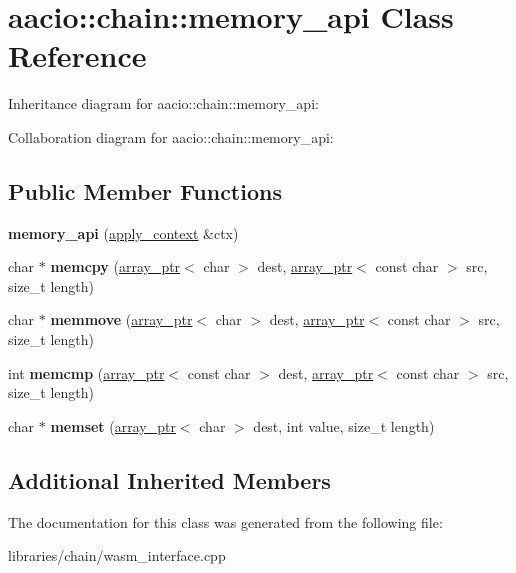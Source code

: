 \hypertarget{classaacio_1_1chain_1_1memory__api}{}\section{aacio\+:\+:chain\+:\+:memory\+\_\+api Class Reference}
\label{classaacio_1_1chain_1_1memory__api}


Inheritance diagram for aacio\+:\+:chain\+:\+:memory\+\_\+api\+:


Collaboration diagram for aacio\+:\+:chain\+:\+:memory\+\_\+api\+:
\subsection*{Public Member Functions}
\begin{DoxyCompactItemize}
\item 
\mbox{\label{classaacio_1_1chain_1_1memory__api_af935de921d20e888a05306e0e84b21d4}} 
{\bfseries memory\+\_\+api} (\mbox{\hyperlink{classaacio_1_1chain_1_1apply__context}{apply\+\_\+context}} \&ctx)
\item 
\mbox{\label{classaacio_1_1chain_1_1memory__api_a9961d90f1a35830996024626225a4db1}} 
char $\ast$ {\bfseries memcpy} (\mbox{\hyperlink{structaacio_1_1chain_1_1array__ptr}{array\+\_\+ptr}}$<$ char $>$ dest, \mbox{\hyperlink{structaacio_1_1chain_1_1array__ptr}{array\+\_\+ptr}}$<$ const char $>$ src, size\+\_\+t length)
\item 
\mbox{\label{classaacio_1_1chain_1_1memory__api_a0aaf09379fb2902f59daea8c034873b4}} 
char $\ast$ {\bfseries memmove} (\mbox{\hyperlink{structaacio_1_1chain_1_1array__ptr}{array\+\_\+ptr}}$<$ char $>$ dest, \mbox{\hyperlink{structaacio_1_1chain_1_1array__ptr}{array\+\_\+ptr}}$<$ const char $>$ src, size\+\_\+t length)
\item 
\mbox{\label{classaacio_1_1chain_1_1memory__api_a7fbb4d97c6d0ef2162ef38c44a30a7d3}} 
int {\bfseries memcmp} (\mbox{\hyperlink{structaacio_1_1chain_1_1array__ptr}{array\+\_\+ptr}}$<$ const char $>$ dest, \mbox{\hyperlink{structaacio_1_1chain_1_1array__ptr}{array\+\_\+ptr}}$<$ const char $>$ src, size\+\_\+t length)
\item 
\mbox{\label{classaacio_1_1chain_1_1memory__api_abc773da7498cdc66da2d9242c0175245}} 
char $\ast$ {\bfseries memset} (\mbox{\hyperlink{structaacio_1_1chain_1_1array__ptr}{array\+\_\+ptr}}$<$ char $>$ dest, int value, size\+\_\+t length)
\end{DoxyCompactItemize}
\subsection*{Additional Inherited Members}


The documentation for this class was generated from the following file\+:\begin{DoxyCompactItemize}
\item 
libraries/chain/wasm\+\_\+interface.\+cpp\end{DoxyCompactItemize}
